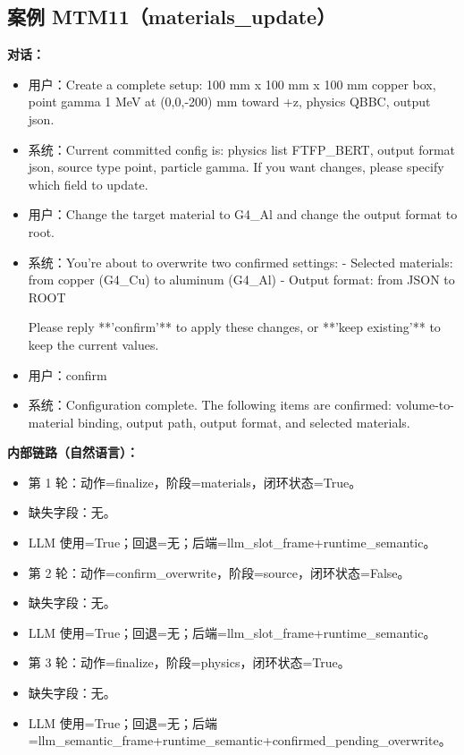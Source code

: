 \documentclass[11pt]{ctexart}
\begin{document}
\subsection{案例 MTM11（materials\_update）}
\textbf{对话：}
\begin{itemize}
\item 用户：Create a complete setup: 100 mm x 100 mm x 100 mm copper box, point gamma 1 MeV at (0,0,-200) mm toward +z, physics QBBC, output json.
\item 系统：Current committed config is: physics list FTFP\_BERT, output format json, source type point, particle gamma. If you want changes, please specify which field to update.
\item 用户：Change the target material to G4\_Al and change the output format to root.
\item 系统：You're about to overwrite two confirmed settings:
- Selected materials: from copper (G4\_Cu) to aluminum (G4\_Al)
- Output format: from JSON to ROOT

Please reply **'confirm'** to apply these changes, or **'keep existing'** to keep the current values.
\item 用户：confirm
\item 系统：Configuration complete. The following items are confirmed: volume-to-material binding, output path, output format, and selected materials.
\end{itemize}
\textbf{内部链路（自然语言）：}
\begin{itemize}
\item 第 1 轮：动作=finalize，阶段=materials，闭环状态=True。
\item 缺失字段：无。
\item LLM 使用=True；回退=无；后端=llm\_slot\_frame+runtime\_semantic。
\item 第 2 轮：动作=confirm\_overwrite，阶段=source，闭环状态=False。
\item 缺失字段：无。
\item LLM 使用=True；回退=无；后端=llm\_slot\_frame+runtime\_semantic。
\item 第 3 轮：动作=finalize，阶段=physics，闭环状态=True。
\item 缺失字段：无。
\item LLM 使用=True；回退=无；后端=llm\_semantic\_frame+runtime\_semantic+confirmed\_pending\_overwrite。
\end{itemize}
\end{document}
